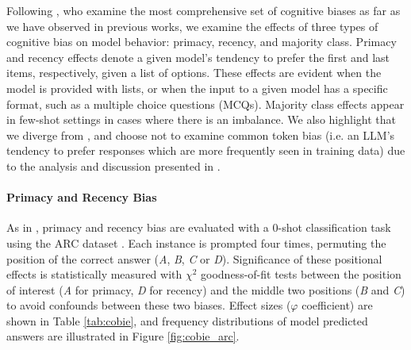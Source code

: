  Following \citet{Zhao2021CalibrateBU}, who examine the most comprehensive set of cognitive biases as far as we have observed in previous works, we examine the effects of three types of cognitive bias on model behavior: primacy, recency, and majority class. Primacy and recency effects denote a given model's tendency to prefer the first and last items, respectively, given a list of options. These effects are evident when the model is provided with lists, or when the input to a given model has a specific format, such as a multiple choice questions (MCQs). Majority class effects appear in few-shot settings in cases where there is an imbalance. We also highlight that we diverge from \citet{Zhao2021CalibrateBU}, and choose not to examine common token bias (i.e. an LLM's tendency to prefer responses which are more frequently seen in training data) due to the analysis and discussion presented in \cite{cobie}.

\begin{table}[ht!]
\centering
{}
\caption{$V$ and $\varphi$ coefficients resulting from the $\chi^2$ independence and goodness-of-fit tests to check majority class, primacy and recency biases, respectively.}
\label{tab:cobie}
\end{table}

\paragraph{Primacy and Recency Bias} As in \cite{cobie}, primacy and recency bias are evaluated with a 0-shot classification task using the ARC dataset \citep{allenai-arc}. Each instance is prompted four times, permuting the position of the correct answer (\textit{A}, \textit{B}, \textit{C} or \textit{D}). Significance of these positional effects is statistically measured with $\chi^2$ goodness-of-fit tests between the position of interest (\textit{A} for primacy, \textit{D} for recency) and the middle two positions (\textit{B} and \textit{C}) to avoid confounds between these two biases. Effect sizes ($\varphi$ coefficient) are shown in Table \ref{tab:cobie}, and frequency distributions of model predicted answers are illustrated in Figure \ref{fig:cobie_arc}.

